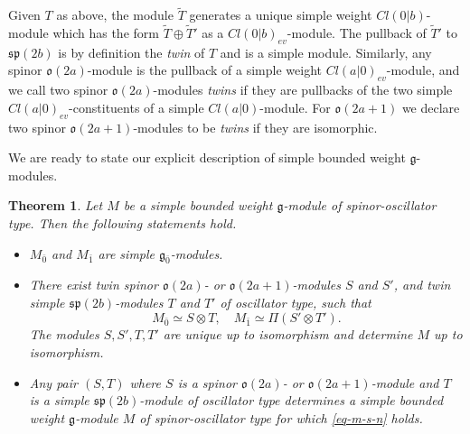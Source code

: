 \documentclass[12pt]{amsart}
\theoremstyle{plain} %
\numberwithin{equation}{section}
\theoremstyle{definition}
\theoremstyle{remark}
\theoremstyle{plain} %
\newtheorem{theorem}[definition]{Theorem}
\renewcommand{\gg}{\mathfrak{g}}
\renewcommand{\sp}{\mathfrak{sp}}
\newcommand{\so}{\mathfrak{o}}
\def\gg{\mathfrak{g}}
\begin{document}
	 
	 Given $T$ as above, the module $\tilde T$ generates a unique simple weight $Cl(0|b)$-module which has the form $\tilde T \oplus \tilde T'$ as a $Cl(0|b)_{ev}$-module. The pullback of $\tilde T'$ to $\sp(2b)$ is by definition the \emph{twin} of $T$ and is a simple module.  Similarly, any spinor $\so(2a)$-module is the pullback of a simple weight $Cl(a|0)_{ev}$-module, and 
	 we call two  spinor $\so(2a)$-modules {\emph{twins}} if they are  pullbacks of the two simple $Cl(a|0)_{ev}$-constituents of a simple $Cl(a|0)$-module. For $\so(2a+1)$ we declare two  spinor $\so(2a+1)$-modules  to be {\emph{twins}} if they are isomorphic. 

 We are ready to state our explicit description of  simple bounded weight $\gg$-modules. 
 	 
	 \begin{theorem}  \label{thm-m-twins} Let $M$ be a simple bounded weight $\gg$-module of spinor-oscillator type. Then the following statements hold.
	 \begin{itemize}
\item[(a)]	$M_{\bar{0}}$ and  $M_{\bar{1}}$ are simple $\gg_{\bar{0}}$-modules.
\item[(b)]	There exist twin spinor $\mathfrak{o}(2a)$- or $\mathfrak{o}(2a+1)$-modules $S$ and $S'$, and twin simple  $\sp(2b)$-modules $T$ and $T'$ of oscillator type, such that 
                      \begin{equation} \label{eq-m-s-n}
                      M_{\bar{0}}\simeq S\otimes T,\quad M_{\bar{1}}\simeq \Pi (S'\otimes T').
                      \end{equation}
                      The modules $S,S',T,T'$ are unique up to isomorphism and determine $M$ up to isomorphism.
\item[(c)] Any pair $(S,T)$ where  $S$ is a  spinor $\so(2a)$- or $\so(2a+1)$-module and $T$ is a simple  $\sp(2b)$-module of oscillator type determines a simple bounded weight $\gg$-module $M$ of spinor-oscillator type for which \eqref{eq-m-s-n} holds. 
	 \end{itemize}	 
	 \end{theorem}
\end{document}
